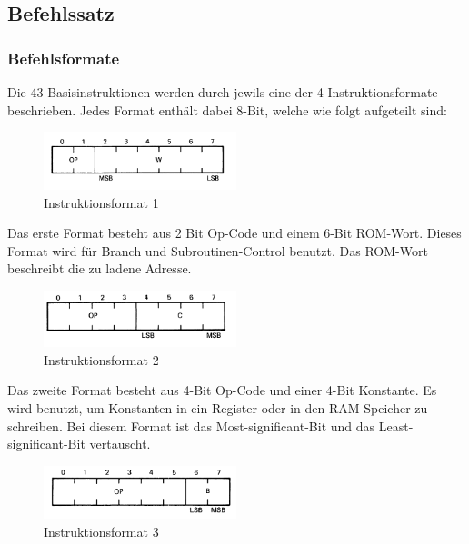 \newpage
\subsection{Befehlssatz}

\subsubsection{Befehlsformate}

Die 43 Basisinstruktionen werden durch jewils eine der 4 Instruktionsformate beschrieben. Jedes Format enth{\"a}lt dabei 8-Bit, welche wie folgt aufgeteilt sind:

\begin{figure}[!htb]
	\centering
		\includegraphics[width=0.5\textwidth]{figures/I1.PNG}
	\caption{Instruktionsformat 1}
	\label{fig:I1}
\end{figure}

Das erste Format besteht aus 2 Bit Op-Code und einem 6-Bit ROM-Wort. Dieses Format wird f{\"u}r Branch und Subroutinen-Control benutzt. Das ROM-Wort beschreibt die zu ladene Adresse.

\begin{figure}[!htb]
	\centering
		\includegraphics[width=0.5\textwidth]{figures/I2.PNG}
	\caption{Instruktionsformat 2}
	\label{fig:I2}
\end{figure}

Das zweite Format besteht aus 4-Bit Op-Code und einer 4-Bit Konstante. Es wird benutzt, um Konstanten in ein Register oder in den RAM-Speicher zu schreiben. Bei diesem Format ist das Most-significant-Bit und das Least-significant-Bit vertauscht.

\begin{figure}[!htb]
	\centering
		\includegraphics[width=0.5\textwidth]{figures/I3.PNG}
	\caption{Instruktionsformat 3}
	\label{fig:I3}
\end{figure}

